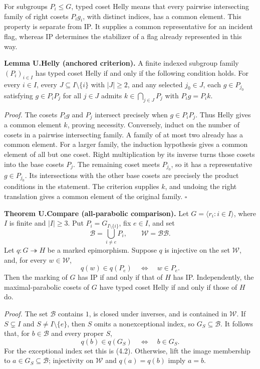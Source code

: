 \documentclass[
  11pt,
  a4paper,
]{article}
\begin{document}
For subgroups \(P_i\leq G\), typed coset Helly means that every pairwise
intersecting family of right cosets \(P_i g_i\), with distinct indices,
has a common element. This property is separate from IP. It supplies a
common representative for an incident flag, whereas IP determines the
stabilizer of a flag already represented in this way.

\textbf{Lemma U.Helly (anchored criterion).} A finite indexed subgroup
family \((P_i)_{i\in I}\) has typed coset Helly if and only if the
following condition holds. For every \(i\in I\), every
\(J\subseteq I\setminus\{i\}\) with \(|J|\geq2\), and any selected
\(j_0\in J\), each \(g\in P_{j_0}\) satisfying \(g\in P_iP_j\) for all
\(j\in J\) admits \(k\in\bigcap_{j\in J}P_j\) with \(P_i g=P_i k\).

\emph{Proof.} The cosets \(P_i g\) and \(P_j\) intersect precisely when
\(g\in P_iP_j\). Thus Helly gives a common element \(k\), proving
necessity. Conversely, induct on the number of cosets in a pairwise
intersecting family. A family of at most two already has a common
element. For a larger family, the induction hypothesis gives a common
element of all but one coset. Right multiplication by its inverse turns
those cosets into the base cosets \(P_j\). The remaining coset meets
\(P_{j_0}\), so it has a representative \(g\in P_{j_0}\). Its
intersections with the other base cosets are precisely the product
conditions in the statement. The criterion supplies \(k\), and undoing
the right translation gives a common element of the original family.
\(\square\)

\textbf{Theorem U.Compare (all-parabolic comparison).} Let
\(G=\langle r_i:i\in I\rangle\), where \(I\) is finite and \(|I|\geq3\).
Put \(P_i=G_{I\setminus\{i\}}\), fix \(e\in I\), and set \[
\mathcal B=\bigcup_{i\ne e}P_i,\qquad
\mathcal W=\mathcal B\mathcal B.
\tag{4.1}
\] Let \(q:G\twoheadrightarrow H\) be a marked epimorphism. Suppose
\(q\) is injective on the set \(\mathcal W\), and, for every
\(w\in\mathcal W\), \[
q(w)\in q(P_e)\quad\Longleftrightarrow\quad w\in P_e.
\tag{4.2}
\] Then the marking of \(G\) has IP if and only if that of \(H\) has IP.
Independently, the maximal-parabolic cosets of \(G\) have typed coset
Helly if and only if those of \(H\) do.

\emph{Proof.} The set \(\mathcal B\) contains \(1\), is closed under
inverses, and is contained in \(\mathcal W\). If \(S\subsetneq I\) and
\(S\ne I\setminus\{e\}\), then \(S\) omits a nonexceptional index, so
\(G_S\subseteq\mathcal B\). It follows that, for \(b\in\mathcal B\) and
every proper \(S\), \[
q(b)\in q(G_S)\quad\Longleftrightarrow\quad b\in G_S.
\tag{4.3}
\] For the exceptional index set this is (4.2). Otherwise, lift the
image membership to \(a\in G_S\subseteq\mathcal B\); injectivity on
\(\mathcal W\) and \(q(a)=q(b)\) imply \(a=b\).
\end{document}
